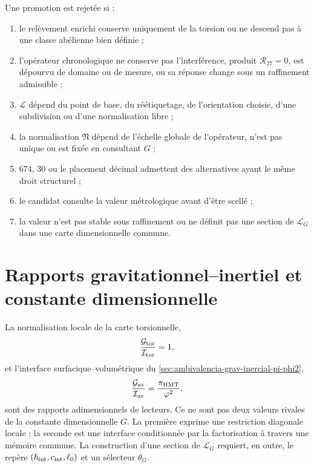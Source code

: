 \begin{criterion}
\label{crit:selector-G}
Une promotion est rejetée si :
\begin{enumerate}
 \item le relèvement enrichi conserve uniquement de la torsion ou ne descend pas
 à une classe abélienne bien définie ;
 \item l'opérateur chronologique ne conserve pas l'interférence, produit
 \(\mathcal R_{27}=0\), est dépourvu de domaine ou de mesure, ou sa réponse change sous
 un raffinement admissible ;
 \item \(\mathscr L\) dépend du point de base, du réétiquetage, de
 l'orientation choisie, d'une subdivision ou d'une normalisation libre ;
 \item la normalisation \(\mathfrak N\) dépend de l'échelle globale de
 l'opérateur, n'est pas unique ou est fixée en consultant \(G\) ;
 \item \(674\), \(30\) ou le placement décimal admettent des alternatives ayant le
 même droit structurel ;
 \item le candidat consulte la valeur métrologique avant d'être scellé ;
 \item la valeur n'est pas stable sous raffinement ou ne définit pas une section de
 \(\mathcal L_G\) dans une carte dimensionnelle commune.
\end{enumerate}
\end{criterion}

\section{Rapports gravitationnel--inertiel et constante dimensionnelle}
\label{sec:razones-no-rivales-G}

La normalisation locale de la carte torsionnelle,
\[
 \frac{\mathcal G_{\rm tor}}{\mathcal I_{\rm tor}}=1,
\]
et l'interface surfacique--volumétrique du
\cref{sec:ambivalencia-grav-inercial-pi-phi2},
\[
 \frac{\mathcal G_{\rm av}}{\mathcal I_{\rm av}}
 =\frac{\pi_{\rm HMT}}{\varphi^{2}},
\]
sont des rapports adimensionnels de lecteurs. Ce ne sont pas deux valeurs rivales de la
constante dimensionnelle \(G\). La première exprime une restriction diagonale
locale ; la seconde est une interface conditionnée par la factorisation à travers une
mémoire commune. La construction d'une section de
\(\mathcal L_G\) requiert, en outre, le repère
\((\hbar_{\rm int},c_{\rm int},\ell_0)\) et un sélecteur
\(\theta_G\).
